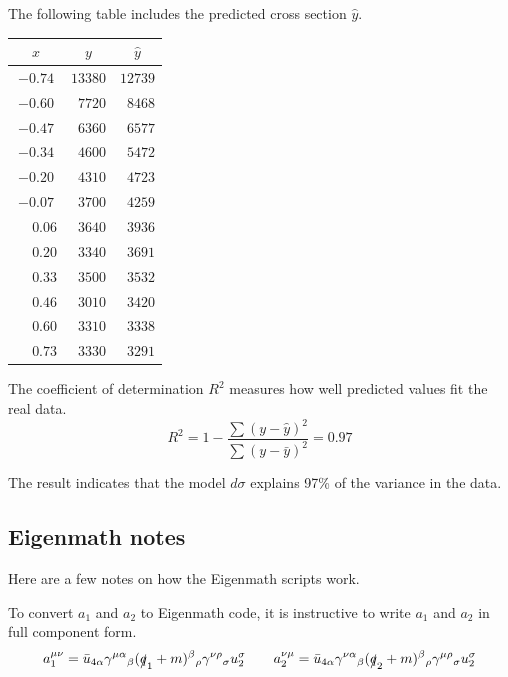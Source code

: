 \documentclass[12pt]{article}
\begin{document}
\noindent
The following table includes the predicted cross section $\hat{y}$.

\begin{center}
\begin{tabular}{|c|c|c|}
\hline
$x$ & $y$ & $\hat{y}$\\
\hline
$-0.74$ & $13380$ & $12739$\\
$-0.60$ & $\phantom{0}7720$ & $\phantom{0}8468$\\
$-0.47$ & $\phantom{0}6360$ & $\phantom{0}6577$\\
$-0.34$ & $\phantom{0}4600$ & $\phantom{0}5472$\\
$-0.20$ & $\phantom{0}4310$ & $\phantom{0}4723$\\
$-0.07$ & $\phantom{0}3700$ & $\phantom{0}4259$\\
$\phantom{+}0.06$ & $\phantom{0}3640$ & $\phantom{0}3936$\\
$\phantom{+}0.20$ & $\phantom{0}3340$ & $\phantom{0}3691$\\
$\phantom{+}0.33$ & $\phantom{0}3500$ & $\phantom{0}3532$\\
$\phantom{+}0.46$ & $\phantom{0}3010$ & $\phantom{0}3420$\\
$\phantom{+}0.60$ & $\phantom{0}3310$ & $\phantom{0}3338$\\
$\phantom{+}0.73$ & $\phantom{0}3330$ & $\phantom{0}3291$\\
\hline
\end{tabular}
\end{center}

\noindent
The coefficient of determination $R^2$ measures how well predicted values fit the real data.
\begin{equation*}
R^2=1-\frac{\sum(y-\hat{y})^2}{\sum(y-\bar{y})^2}=0.97
\end{equation*}

\noindent
The result indicates that the model $d\sigma$ explains 97\% of the variance in the data.

\subsection*{Eigenmath notes}

Here are a few notes on how the Eigenmath scripts work.

\bigskip
\noindent
To convert $a_1$ and $a_2$ to Eigenmath code,
it is instructive to write $a_1$ and $a_2$ in full component form.
\begin{equation*}
a_1^{\mu\nu}
=\bar{u}_{4\alpha}\gamma^{\mu\alpha}{}_\beta(\slashed{q}_1+m)^\beta{}_\rho\gamma^{\nu\rho}{}_\sigma u_2^\sigma
\qquad
a_2^{\nu\mu}
=\bar{u}_{4\alpha}\gamma^{\nu\alpha}{}_\beta(\slashed{q}_2+m)^\beta{}_\rho\gamma^{\mu\rho}{}_\sigma u_2^\sigma
\end{equation*}
\end{document}

